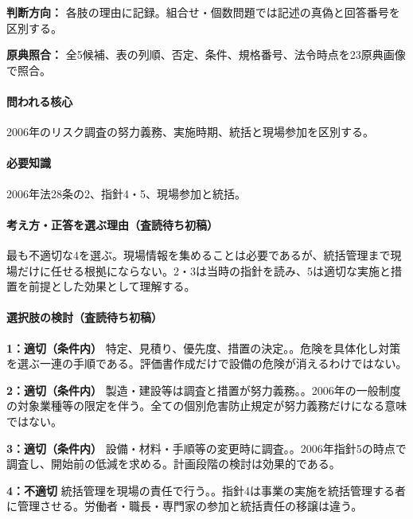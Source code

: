 \noindent\textbf{判断方向：} 各肢の理由に記録。組合せ・個数問題では記述の真偽と回答番号を区別する。\par

\noindent\textbf{原典照合：} 全5候補、表の列順、否定、条件、規格番号、法令時点を23原典画像で照合。\par

\paragraph{問われる核心} 2006年のリスク調査の努力義務、実施時期、統括と現場参加を区別する。

\paragraph{必要知識} 2006年法28条の2、指針4・5、現場参加と統括。

\paragraph{考え方・正答を選ぶ理由（査読待ち初稿）} 最も不適切な4を選ぶ。現場情報を集めることは必要であるが、統括管理まで現場だけに任せる根拠にならない。2・3は当時の指針を読み、5は適切な実施と措置を前提とした効果として理解する。

\paragraph{選択肢の検討（査読待ち初稿）}\mbox{}\par

\noindent\textbf{1：適切（条件内）} 特定、見積り、優先度、措置の決定。。危険を具体化し対策を選ぶ一連の手順である。評価書作成だけで設備の危険が消えるわけではない。\par

\noindent\textbf{2：適切（条件内）} 製造・建設等は調査と措置が努力義務。。2006年の一般制度の対象業種等の限定を伴う。全ての個別危害防止規定が努力義務だけになる意味ではない。\par

\noindent\textbf{3：適切（条件内）} 設備・材料・手順等の変更時に調査。。2006年指針5の時点で調査し、開始前の低減を求める。計画段階の検討は効果的である。\par

\noindent\textbf{4：不適切} 統括管理を現場の責任で行う。。指針4は事業の実施を統括管理する者に管理させる。労働者・職長・専門家の参加と統括責任の移譲は違う。\par

